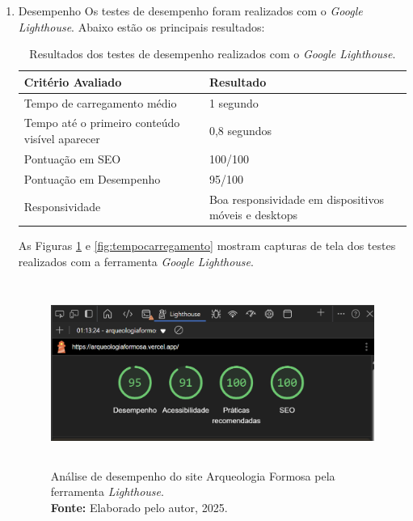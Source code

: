 \begin{enumerate}

\item{Desempenho}
Os testes de desempenho foram realizados com o \textit{Google Lighthouse}. Abaixo estão os principais resultados:
\begin{table}[H]
\centering
\caption{Resultados dos testes de desempenho realizados com o \textit{Google Lighthouse}.}
\label{tab:desempenho}
\begin{tabularx}{\textwidth}{|l|X|} %
\hline
\textbf{Critério Avaliado} & \textbf{Resultado} \\ \hline
Tempo de carregamento médio & 1 segundo \\ \hline
Tempo até o primeiro conteúdo visível aparecer & 0,8 segundos \\ \hline
Pontuação em SEO & 100/100 \\ \hline
Pontuação em Desempenho & 95/100 \\ \hline
Responsividade & Boa responsividade em dispositivos móveis e desktops \\ \hline
\end{tabularx}
\end{table}
As Figuras \ref{fig:lighthouse} e \ref{fig:tempocarregamento} mostram capturas de tela dos testes realizados com a ferramenta \textit{Google Lighthouse}.
\begin{figure}[H]
    \centering
    \includegraphics[height=6cm, keepaspectratio]{img/site/lighthouse_only.png}
    \caption{Análise de desempenho do site Arqueologia Formosa pela ferramenta \textit{Lighthouse}. \\
    \textbf{Fonte:} Elaborado pelo autor, 2025.}
    \label{fig:lighthouse}
\end{figure}


\end{enumerate}

